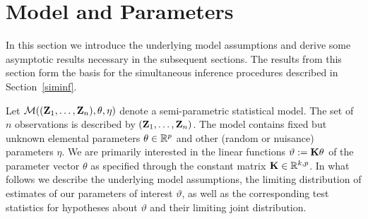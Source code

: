 \documentclass[12pt,a4paper]{article}
\begin{document}
\section{Model and Parameters}

\label{model}

In this section we introduce the underlying model assumptions and derive
some asymptotic results necessary in the subsequent sections. The results
from this section form the basis for the simultaneous inference procedures
described in Section~\ref{siminf}.

Let $\mathcal{M}((\mathbf{Z}_1, \dots, \mathbf{Z}_n), \theta, \eta)$ denote a semi-parametric statistical
model. The set of $n$ observations is described by $(\mathbf{Z}_1, \dots, \mathbf{Z}_n)$. 
The model contains fixed but unknown elemental parameters $\theta
\in \mathbb{R}^p$ and other (random or nuisance) parameters $\eta$. We are
primarily interested in the linear functions $\vartheta := \mathbf{K} \theta$ of the parameter vector 
$\theta$ as specified through the constant matrix $\mathbf{K} \in \mathbb{R}^{k, p}$.
In what follows we describe the underlying
model assumptions, the limiting distribution of estimates of our parameters of 
interest $\vartheta$, as well
as the corresponding test statistics for hypotheses about $\vartheta$ 
and their limiting joint distribution.
\end{document}
